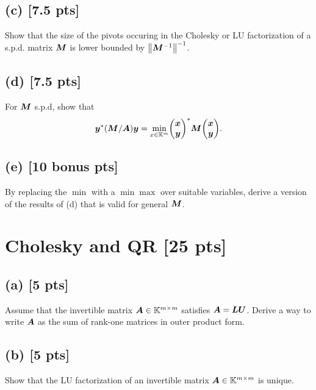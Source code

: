 \documentclass[twoside,10pt]{article}
\begin{document}
\subsection*{(c) [7.5 pts]} 
Show that the size of the pivots occuring in the Cholesky or LU factorization of a s.p.d. matrix $\bm{M}$ is lower bounded by $\left\|\mtx{M}^{-1}\right\|^{-1}$.

\subsection*{(d) [7.5 pts]}
For $\bm{M}$ s.p.d, show that 
\begin{equation} 
  \vct{y}^* \left(\mtx{M} / \mtx{A}\right) \vct{y} = \min \limits_{x \in \K^{m}} 
  \begin{pmatrix}
    \vct{x}\\
    \vct{y} 
  \end{pmatrix}^* 
  \mtx{M}
  \begin{pmatrix}
    \vct{x}\\
    \vct{y} 
  \end{pmatrix}.
\end{equation}

\subsection*{(e) [10 bonus pts]} 
By replacing the $\min$ with a $\min \max$ over suitable variables, derive a version of the results of (d) that is valid for general $\bm{M}$.



\section{Cholesky and QR [25 pts]}

\subsection*{(a) [5 pts]}
Assume that the invertible matrix $\bm{A} \in \mathbb{K}^{m \times m}$ satisfies $\bm{A} = \bm{L} \bm{U}$.   
Derive a way to write $\bm{A}$ as the sum of rank-one matrices in outer product form. 

\subsection*{(b) [5 pts]}
Show that the LU factorization of an invertible matrix $\bm{A} \in \mathbb{K}^{m \times m}$ is unique. 
\end{document}
